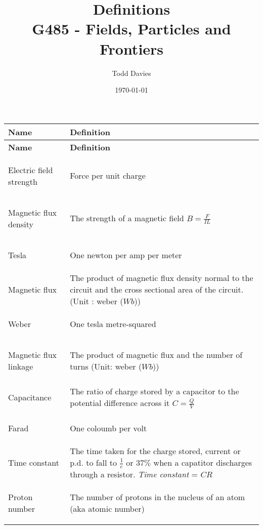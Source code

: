 \documentclass{article}
\title{Definitions \\ \large{G485 - Fields, Particles and Frontiers}}
\author{Todd Davies}
\date{\today}
\begin{document}
\lhead{\today}

\maketitle

\thispagestyle{empty}

\begin{longtable}{>{\bf\centering\arraybackslash}p{1in} 
  p{\textwidth-4\tabcolsep-1in}}

\large{Name} & \large{\textbf{Definition}}\\ \midrule
\endfirsthead
\large{Name} & \large{\textbf{Definition}}\\ \midrule
\endhead
\midrule
\multicolumn{2}{r}{continued \ldots}
\endfoot
\endlastfoot
  
  Electric field strength & Force per unit charge\\ \midrule
  
  Magnetic flux density & The strength of a magnetic field $B = \frac{F}{IL}$\\
  \midrule

  Tesla & One newton per amp per meter\\ \midrule

  Magnetic flux & The product of magnetic flux density normal to the circuit and
  the cross sectional area of the circuit. (Unit : weber ($Wb$))\\ \midrule

  Weber & One tesla metre-squared\\ \midrule

  Magnetic flux linkage & The product of magnetic flux and the number of turns
  (Unit: weber ($Wb$))\\ \midrule

  Capacitance & The ratio of charge stored by a capacitor to the potential
  difference across it $C = \frac{Q}{V}$\\ \midrule

  Farad & One coloumb per volt\\ \midrule

  Time constant & The time taken for the charge stored, current or p.d. to fall
  to $\frac{1}{e}$ or $37\%$ when a capatitor discharges through a resistor.
  {\it Time constant} = $CR$\\ \midrule

  Proton number & The number of protons in the nucleus of an atom (aka atomic
  number)\\ \midrule


\end{longtable}
\end{document}
